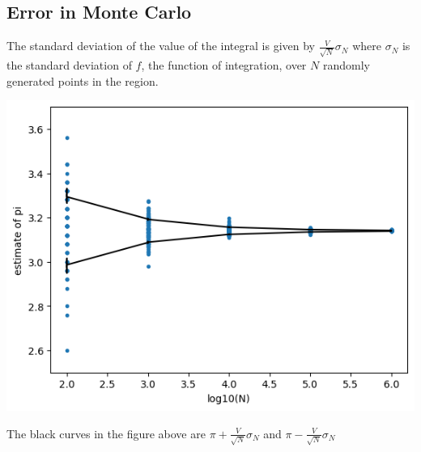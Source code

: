 \documentclass[12pt,letterpaper,noanswers]{exam}
\begin{document}


\subsection*{Error in Monte Carlo}

The standard deviation of the value of the integral is given by $\frac{V}{\sqrt{N}}\sigma_N$ where $\sigma_N$ is the standard deviation of $f$, the function of integration, over $N$ randomly generated points in the region.



\includegraphics[width=0.5\linewidth]{img/C17piest.png}

The black curves in the figure above are $\pi + \frac{V}{\sqrt{N}}\sigma_N$ and $\pi - \frac{V}{\sqrt{N}}\sigma_N$

\vspace{0.1cm}

    
\end{document}

